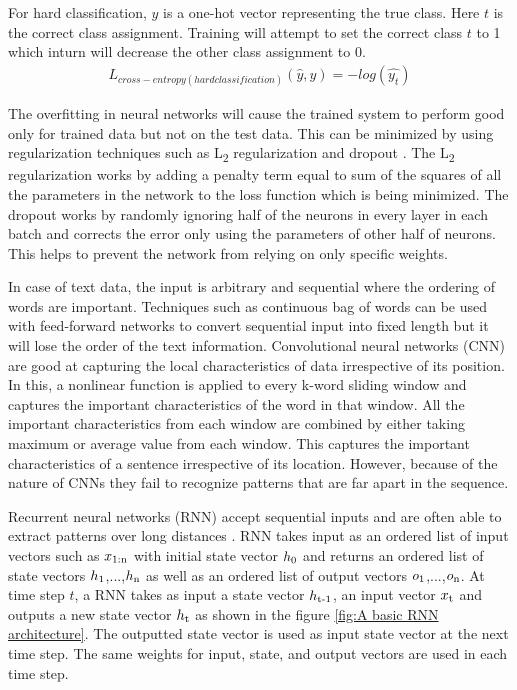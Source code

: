 \documentclass[a4paper, 11pt]{article}
\begin{document}
For hard classification, $y$ is a one-hot vector representing the true class. Here $t$ is the correct class assignment. Training will attempt to set the correct class $t$ to 1 which inturn will decrease the other class assignment to 0.
\begin{align*}
L_{cross-entropy(hard classification)}(\hat{y},y) = -log(\hat{y_t})
\end{align*}

The overfitting in neural networks will cause the trained system to perform good only for trained data but not on the test data. This can be minimized by using regularization techniques such as L\textsubscript{2} regularization and dropout \cite{Hinton2012}. The L\textsubscript{2} regularization works by adding a penalty term equal to sum of the squares of all the parameters in the network to the loss function which is being minimized. The dropout works by randomly ignoring half of the neurons in every layer in each batch and corrects the error only using the parameters of other half of neurons. This helps to prevent the network from relying on only specific weights. 

In case of text data, the input is arbitrary and sequential where the ordering of words are important. Techniques such as continuous bag of words \cite{DBLP:journals/corr/abs-1301-3781} can be used with feed-forward networks to convert sequential input into fixed length but it will lose the order of the text information. Convolutional neural networks (CNN) \cite{Bengio1997} are good at capturing the local characteristics of data irrespective of its position. In this, a nonlinear function is applied to every k-word sliding window and captures the important characteristics of the word in that window. All the important characteristics from each window are combined by either taking maximum or average value from each window. This captures the important characteristics of a sentence irrespective of its location. However, because of the nature of CNNs they fail to recognize patterns that are far apart in the sequence.

Recurrent neural networks (RNN) accept sequential inputs and are often able to extract patterns over long distances \cite{Elman}. RNN takes input as an ordered list of input vectors such as $x\textsubscript{1:n}$ with initial state vector $h\textsubscript{0}$ and returns an ordered list of state vectors $h\textsubscript{1}$,...,$h\textsubscript{n}$ as well as an ordered list of output vectors $o\textsubscript{1}$,...,$o\textsubscript{n}$. At time step $t$, a RNN takes as input a state vector $h\textsubscript{t-1}$, an input vector $x\textsubscript{t}$ and outputs a new state vector $h\textsubscript{t}$ as shown in the figure \ref{fig:A basic RNN architecture}. The outputted state vector is used as input state vector at the next time step. The same weights for input, state, and output vectors are used in each time step.  
\end{document}
